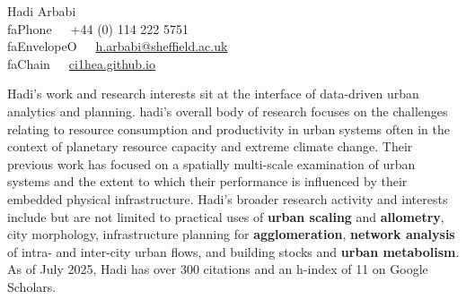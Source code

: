\documentclass[10pt]{article}
\newcommand{\seticon}[1]{\csname #1\endcsname}
\newcommand{\makeheading}[2][]%
        {\hspace*{-\marginparsep minus \marginparwidth}%
         \begin{minipage}[t]{\textwidth+\marginparwidth+\marginparsep}%
             {\large \bfseries #2 \hfill #1}\\[-0.15\baselineskip]%
                 \rule{\columnwidth}{1pt}%
         \end{minipage}}
\renewcommand{\section}[1]{\pagebreak[3]%
    \vspace{1.3\baselineskip}%
    \phantomsection\addcontentsline{toc}{section}{#1}%
    \noindent\llap{\large\smash{\parbox[t]{\marginparwidth}{\raggedright #1}}}%
    \vspace{-\baselineskip}\par}
\providecommand*\email[1]{\href{mailto:#1}{#1}}
\begin{document}
\vspace*{25mm}
{\Huge Hadi Arbabi}\\[1cm]
\seticon{faPhone}~~~+44 (0) 114 222 5751\\
\seticon{faEnvelopeO}~~~\href{mailto:h.arbabi@sheffield.ac.uk}{h.arbabi@sheffield.ac.uk}\\
\seticon{faChain}~~~\href{https://ci1hea.github.io}{ci1hea.github.io}\\

\section{}
Hadi's work and research interests sit at the interface of data-driven urban analytics and planning. hadi’s overall body of research focuses on the challenges relating to resource consumption and productivity in urban systems often in the context of planetary resource capacity and extreme climate change. Their previous work has focused on a spatially multi-scale examination of urban systems and the extent to which their performance is influenced by their embedded physical infrastructure. Hadi's broader research activity and interests include but are not limited to practical uses of \textbf{urban scaling} and \textbf{allometry}, city morphology, infrastructure planning for \textbf{agglomeration}, \textbf{network analysis} of intra- and inter-city urban flows, and building stocks and \textbf{urban metabolism}. As of July 2025, Hadi has over 300 citations and an h-index of 11 on Google Scholars.\par
\end{document}

